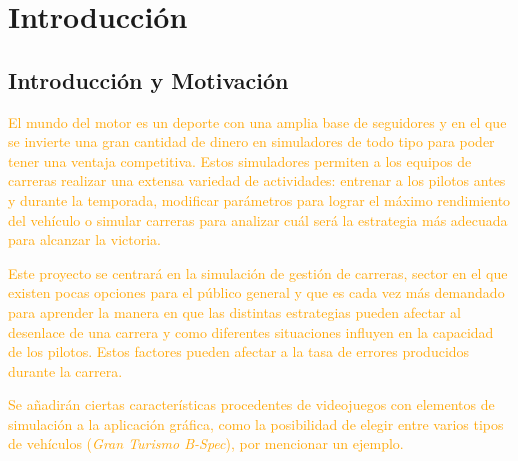 \documentclass[a4paper,11pt]{book}
\begin{document}



\tableofcontents
\newpage
%
\chapter{Introducción}
\section{Introducción y Motivación}


\textcolor{orange}{El mundo del motor es un deporte con una amplia base de seguidores y en el que se invierte una gran cantidad de dinero en simuladores de todo tipo para poder tener una ventaja competitiva. Estos simuladores permiten a los equipos de carreras realizar una extensa variedad de actividades: entrenar a los pilotos antes y durante la temporada, modificar parámetros para lograr el máximo rendimiento del vehículo o simular carreras para analizar cuál será la estrategia más adecuada para alcanzar la victoria.}

\bigskip


\textcolor{orange}{Este proyecto se centrará en la simulación de gestión de carreras, sector en el que existen pocas opciones para el público general y que es cada vez más demandado para aprender la manera en que las distintas estrategias pueden afectar al desenlace de una carrera y como diferentes situaciones influyen en la capacidad de los pilotos. Estos factores pueden afectar a la tasa de errores producidos durante la carrera.}

\bigskip

\textcolor{orange}{Se añadirán ciertas características procedentes de videojuegos con elementos de simulación a la aplicación gráfica, como la posibilidad de elegir entre varios tipos de vehículos (\textit{Gran Turismo B-Spec}), por mencionar un ejemplo.}
\end{document}
